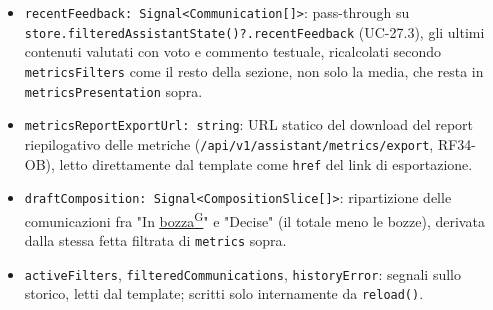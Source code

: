 \documentclass[a4paper,12pt]{article}
\providecommand{\glslink}[2]{\href{https://alittlebyte-19.github.io/Documentazione/glossario.html\#gls-#1}{\underline{#2}\textsuperscript{\scriptsize G}}}
\begin{document}
\begin{sloppypar}
\begin{itemize}
    \item \texttt{recentFeedback: Signal<Communication[]>}: pass-through su \texttt{store.filteredAssistantState()?.recentFeedback} (UC-27.3), gli ultimi contenuti valutati con voto e commento testuale, ricalcolati secondo \texttt{metricsFilters} come il resto della sezione, non solo la media, che resta in \texttt{metricsPresentation} sopra.
    \item \texttt{metricsReportExportUrl: string}: URL statico del download del report riepilogativo delle metriche (\texttt{/api/v1/assistant/metrics/export}, RF34-OB), letto direttamente dal template come \texttt{href} del link di esportazione.
    \item \texttt{draftComposition: Signal<CompositionSlice[]>}: ripartizione delle comunicazioni fra "In \glslink{bozza-draft}{bozza}" e "Decise" (il totale meno le bozze), derivata dalla stessa fetta filtrata di \texttt{metrics} sopra.
    \item \texttt{activeFilters}, \texttt{filteredCommunications}, \texttt{historyError}: segnali sullo storico, letti dal template; scritti solo internamente da \texttt{reload()}.
\end{itemize}


\end{sloppypar}
\end{document}

